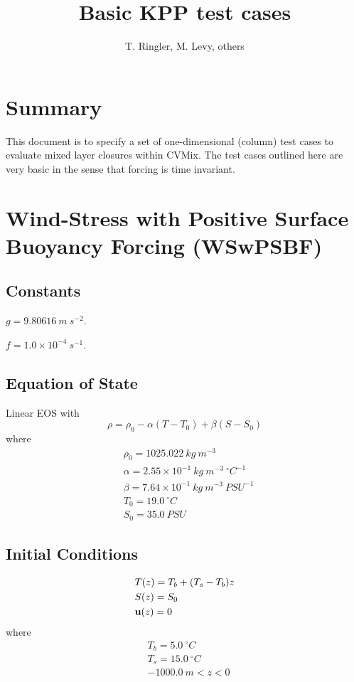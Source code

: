 \documentclass[fleqn, 12pt]{report}
\begin{document}
\title{
Basic KPP test cases}
\author{T. Ringler, M. Levy, others}

\maketitle
\tableofcontents


\chapter{Summary}
This document is to specify a set of one-dimensional (column) test cases to evaluate mixed layer closures within CVMix. The test cases outlined here are very basic in the sense that forcing is time invariant.

\chapter{Wind-Stress with Positive Surface Buoyancy Forcing (WSwPSBF)}

\section{Constants}

$g=9.80616 \ m \ s^{-2}$.

$f=1.0 \times 10^{-4} \ s^{-1}$.

\section{Equation of State}
Linear EOS with
\begin{equation}
\rho = \rho_0 - \alpha (T-T_0) + \beta (S-S_0)
\end{equation}
where 
\begin{align*}
&\rho_0=1025.022 \ kg \ m^{-3} \\
&\alpha=2.55\times10^{-1} \ kg \ m^{-3} \ ^{\circ}C^{-1} \\
&\beta=7.64\times10^{-1} \ kg \ m^{-3} \ {PSU}^{-1} \\
&T_0= 19.0 \ ^{\circ}C \\
&S_0=35.0 \ PSU 
\end{align*}

\section{Initial Conditions}

\begin{align*}
&T(z) = T_b + (T_s - T_b)z  \\
&S(z) = S_0 \\
&{\bf u}(z) = 0
\end{align*}
where
\begin{align*}
&T_b=5.0 \ ^{\circ}C \\
&T_s=15.0 \ ^{\circ}C \\
&-1000.0 \ m <z<0
\end{align*}
\end{document}

